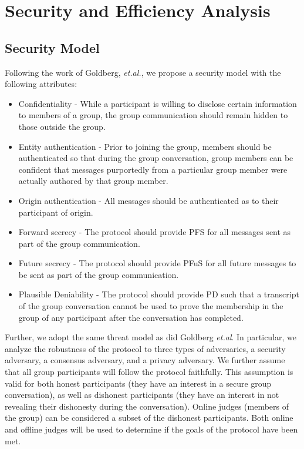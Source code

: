 \documentclass[%
preprint,
amsmath,amssymb,
aps,
prb,
floatfix,
]{revtex4-1}
\begin{document}
\section{\label{sec:analysis}Security and Efficiency Analysis}

\subsection{\label{sec:securitymodel}Security Model}
Following the work of Goldberg, \textit{et.al.}\cite{ref:goldberg}, we propose a
security model with the following attributes:
\begin{itemize}
\item Confidentiality - While a participant is willing to disclose certain
information to members of a group, the group communication should remain hidden
to those outside the group.
\item Entity authentication - Prior to joining the group, members should be
authenticated so that during the group conversation, group members can be
confident that messages purportedly from a particular group member were
actually authored by that group member.
\item Origin authentication - All messages should be authenticated as to their
participant of origin.
\item Forward secrecy - The protocol should provide PFS for all messages sent as
part of the group communication.
\item Future secrecy - The protocol should provide PFuS for all future messages
to be sent as part of the group communication.
\item Plausible Deniability - The protocol should provide PD such that a
transcript of the group conversation cannot be used to prove the membership in
the group of any participant after the conversation has completed.
\end{itemize}

Further, we adopt the same threat model as did Goldberg
\textit{et.al}\cite{ref:goldberg}. In particular, we analyze the robustness of
the protocol to three types of adversaries, a security adversary, a consensus
adversary, and a privacy adversary. We further assume that all group
participants will follow the protocol faithfully. This assumption is valid for
both honest participants (they have an interest in a secure group conversation),
as well as dishonest participants (they have an interest in not revealing their
dishonesty during the conversation).  Online judges (members of the group) can
be considered a subset of the dishonest participants. Both online and offline
judges will be used to determine if the goals of the protocol have been met.
\end{document}
